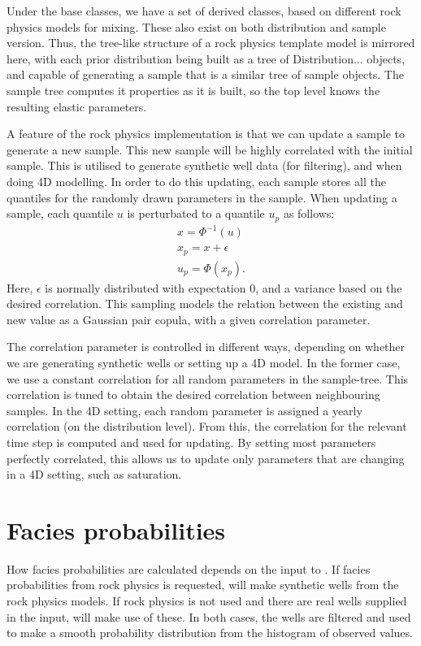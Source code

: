 Under the base classes, we have a set of derived classes, based on different rock physics models for mixing. These also exist on both distribution and sample version. Thus, the tree-like structure of a rock physics template model is mirrored here, with each prior distribution being built as a tree of Distribution... objects, and capable of generating a sample that is a similar tree of sample objects. The sample tree computes it properties as it is built, so the top level knows the resulting elastic parameters.

A feature of the rock physics implementation is that we can update a sample to generate a new sample. This new sample will be highly correlated with the initial sample. This is utilised to generate synthetic well data (for filtering), and when doing 4D modelling. In order to do this updating, each sample stores all the quantiles for the randomly drawn parameters in the sample. When updating a sample, each quantile $u$ is perturbated to a quantile $u_p$ as follows:
\begin{eqnarray}
x = \Phi^{-1}(u) \\
x_p = x + \epsilon \\
u_p = \Phi(x_p).
\end{eqnarray}
Here, $\epsilon$ is normally distributed with expectation 0, and a variance based on the desired correlation. This sampling models the relation between the existing and new value as a Gaussian pair copula, with a given correlation parameter.

The correlation parameter is controlled in different ways, depending on whether we are generating synthetic wells or setting up a 4D model. In the former case, we use a constant correlation for all random parameters in the sample-tree. This correlation is tuned to obtain the desired correlation between neighbouring samples. In the 4D setting, each random parameter is assigned a yearly correlation (on the distribution level). From this, the correlation for the relevant time step is computed and used for updating. By setting most parameters perfectly correlated, this allows us to update only parameters that are changing in a 4D setting, such as saturation.

\section{Facies probabilities}
How facies probabilities are calculated depends on the input to \crava. If facies probabilities from rock physics is requested, \crava will make synthetic wells from the rock physics models. If rock physics is not used and there are real wells supplied in the input, \crava will make use of these. In both cases, the wells are filtered and used to make a smooth probability distribution from the histogram of observed values. 
